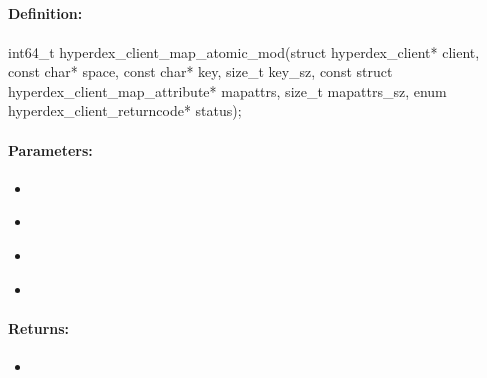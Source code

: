 \pagebreak
\subsection{}
\label{api:c:map_atomic_mod}


\paragraph{Definition:}
\begin{ccode}
int64_t hyperdex_client_map_atomic_mod(struct hyperdex_client* client,
        const char* space,
        const char* key, size_t key_sz,
        const struct hyperdex_client_map_attribute* mapattrs, size_t mapattrs_sz,
        enum hyperdex_client_returncode* status);
\end{ccode}

\paragraph{Parameters:}
\begin{itemize}[noitemsep]
\item {}\\

\item {}\\

\item {}\\

\item {}\\

\end{itemize}

\paragraph{Returns:}
\begin{itemize}[noitemsep]
\item {}\\

\end{itemize}

